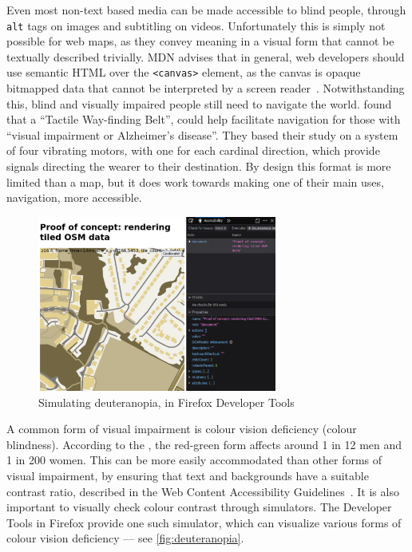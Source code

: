 \documentclass{final_report}
\begin{document}
Even most non-text based media can be made accessible to blind people, through \texttt{alt} tags on images and subtitling on videos. Unfortunately this is simply not possible for web maps, as they convey meaning in a visual form that cannot be textually described trivially. MDN advises that in general, web developers should use semantic HTML over the \texttt{<canvas>} element, as the canvas is opaque bitmapped data that cannot be interpreted by a screen reader~\cite{mdn-element-reference-canvas}. Notwithstanding this, blind and visually impaired people still need to navigate the world. \textcite{accessible-wayfinding-belt} found that a ``Tactile Way-finding Belt'', could help facilitate navigation for those with ``visual impairment or Alzheimer’s disease''. They based their study on a system of four vibrating motors, with one for each cardinal direction, which provide signals directing the wearer to their destination. By design this format is more limited than a map, but it does work towards making one of their main uses, navigation, more accessible.

\begin{figure}[ht]
    \centering
    \includegraphics[width=0.7\textwidth]{../final-deliverable/screenshots/simulated-deuteranopia.png}
    \caption{Simulating deuteranopia, in Firefox Developer Tools}\label{fig:deuteranopia}
\end{figure}

A common form of visual impairment is colour vision deficiency (colour blindness). According to the \textcite{nhs-colour-vision-deficiency}, the red-green form affects around 1 in 12 men and 1 in 200 women. This can be more easily accommodated than other forms of visual impairment, by ensuring that text and backgrounds have a suitable contrast ratio, described in the Web Content Accessibility Guidelines~\cite{w3c-wcag}. It is also important to visually check colour contrast through simulators. The Developer Tools in Firefox provide one such simulator, which can visualize various forms of colour vision deficiency --- see \autoref{fig:deuteranopia}.
\end{document}
